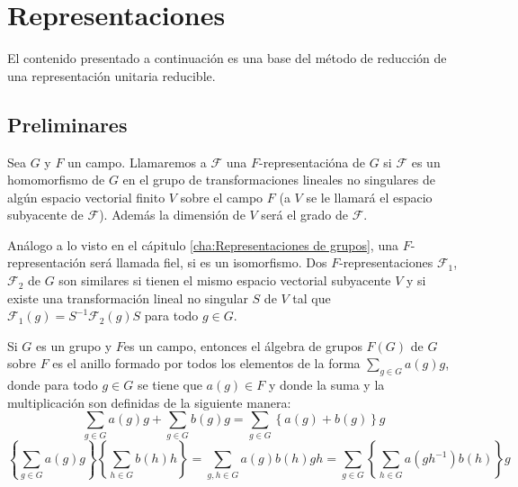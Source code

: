\documentclass[12pt]{book}
\theoremstyle{definition}
\newcounter{in}
\newcounter{ini}
\begin{document}
\chapter{Representaciones}
\label{cha:Representaciones}

El contenido presentado a continuación es una base del método de
reducción de una representación unitaria reducible.

\section{Preliminares}
\label{sec:preliminares}
Sea $G$ y $F$ un campo. Llamaremos a $\mathcal{F}$ una
$F$-representacióna de $G$ si $\mathcal{F}$ es un homomorfismo de $G$
en el grupo de transformaciones lineales no singulares de algún
espacio vectorial finito $V$ sobre el campo $F$ (a $V$ se le llamará
el espacio subyacente de $\mathcal{F}$). Además la dimensión de $V$
será el grado de $\mathcal{F}$.

Análogo a lo visto en el cápitulo \ref{cha:Representaciones de
  grupos}, una $F$-representación será llamada fiel, si es un
isomorfismo. Dos $F$-representaciones $\mathcal{F}_{1}$,
$\mathcal{F}_{2}$ de $G$ son similares si tienen el mismo espacio
vectorial subyacente $V$ y si existe una transformación lineal no
singular $S$ de $V$ tal que
$\mathcal{F}_{1}(g)=S^{-1} \mathcal{F}_{2}(g)S$ para todo $g \in G$.
 
Si $G$ es un grupo y $F$es un campo, entonces el álgebra de grupos
$F(G)$ de $G$ sobre $F$ es el anillo formado por todos los elementos
de la forma $\sum_{g \in G} a(g)g$, donde para todo $g \in G$ se tiene
que $a(g) \in F$ y donde la suma y la multiplicación son definidas de
la siguiente manera:
\begin{equation}
  \label{eq:69}
  \sum_{g \in G} a(g)g + \sum_{g \in G} b(g)g = \sum_{g \in G} \left\{ a(g) + b(g) \right\} g
\end{equation}
\begin{equation}
  \label{eq:71}
  \left\{ \sum_{g \in G} a(g)g \right\} \left\{ \sum_{h \in G} b(h)h \right\} = \sum_{g,h \in G} a(g)b(h)gh = \sum_{g \in G} \left\{ \sum_{h \in G} a(gh^{-1})b(h) \right\} g
\end{equation}
\end{document}
